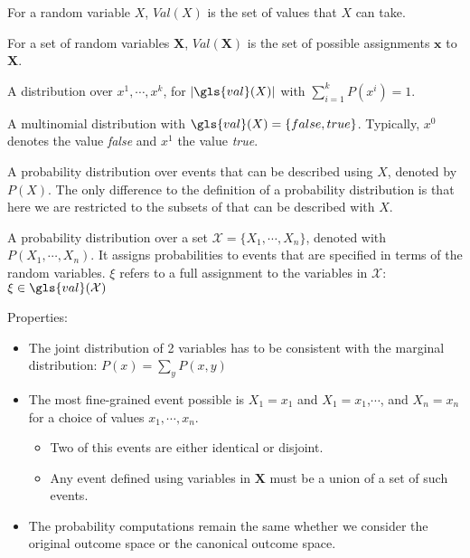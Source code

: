 {%
  For a \gls{random variable} $X$, $Val(X)$ is the set of values that $X$ can take.

  For a \gls{set of random variables} $\bm{X}$, $Val(\bm{X})$ is the set of possible assignments $\bm{x}$ to $\bm{X}$.
}

{%
  A distribution over $x^1,\cdots,x^k$, for $\lvert\gls{val}(X)\rvert$ with $\sum_{i=1}^k P(x^i)=1$.
}

{%
  A \gls{multinomial distribution} with $\gls{val}(X)=\{false,true\}$. Typically, $x^0$ denotes the value \textit{false} and $x^1$ the value \textit{true}.
}

{%
  A \gls{probability distribution} over events that can be described using $X$, denoted by $P(X)$. The only difference to the definition of a \gls{probability distribution} is that here we are restricted to the subsets of  that can be described with $X$.
}

{%
  A \gls{probability distribution} over a set $\mathcal{X}=\{X_1,\cdots,X_n\}$, denoted with $P(X_1,\cdots,X_n)$. It assigns probabilities to events that are specified in terms of the \glspl{random variable}. $\xi$ refers to a full assignment to the variables in $\mathcal{X}$: $\xi\in\gls{val}(\mathcal{X})$

  Properties:
  \begin{itemize}
    \item The joint distribution of 2 variables has to be consistent with the \gls{marginal distribution}: $P(x)=\sum_{y}P(x,y)$
    \item The most fine-grained event possible is $X_1=x_1$ and $X_1=x_1$,$\cdots$, and $X_n=x_n$ for a choice of values $x_1,\cdots,x_n$.
    \begin{itemize}
      \item Two of this events are either identical or disjoint.
      \item Any event defined using variables in $\bm{X}$ must be a union of a set of such events.
    \end{itemize}
    \item The probability computations remain the same whether we consider the original outcome space or the \gls{canonical outcome space}.
  \end{itemize}

}

